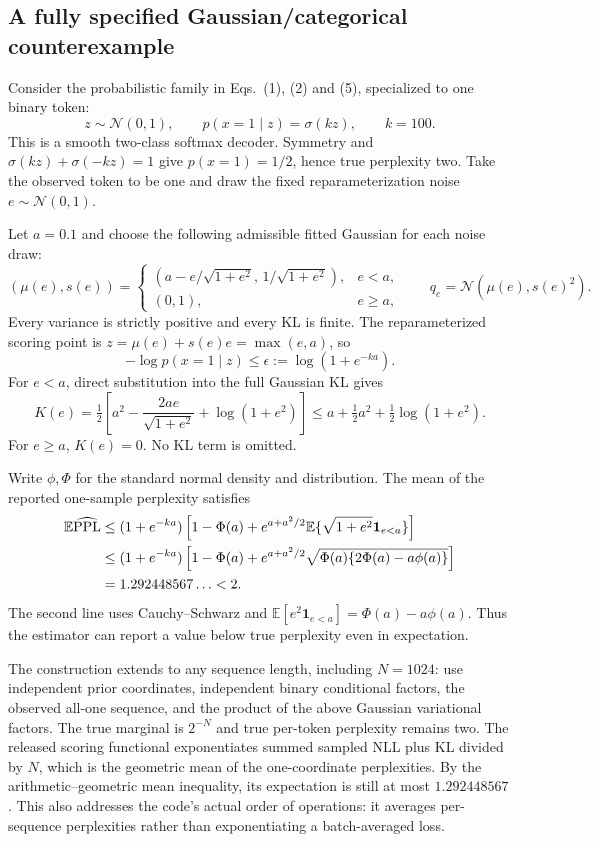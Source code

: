\documentclass[10pt]{article}
\begin{document}
\subsection*{A fully specified Gaussian/categorical counterexample}
Consider the probabilistic family in Eqs. (1), (2) and (5), specialized to one binary token: \[z\sim\mathcal N(0,1),\qquad
 p(x=1\mid z)=\sigma(kz),\qquad k=100.\] This is a smooth two-class softmax decoder. Symmetry and \(\sigma(kz)+\sigma(-kz)=1\) give \(p(x=1)=1/2\), hence true perplexity two. Take the observed token to be one and draw the fixed reparameterization noise \(e\sim\mathcal N(0,1)\).\par
Let \(a=0.1\) and choose the following admissible fitted Gaussian for each noise draw: \[(\mu(e),s(e))=
 \begin{cases}
 (a-e/\sqrt{1+e^2},\,1/\sqrt{1+e^2}),&e<a,\\
 (0,1),&e\ge a,
 \end{cases}
 \qquad q_e=\mathcal N(\mu(e),s(e)^2).\] Every variance is strictly positive and every KL is finite. The reparameterized scoring point is \(z=\mu(e)+s(e)e=\max(e,a)\), so \[-\log p(x=1\mid z)\le
 \epsilon:=\log(1+e^{-ka}).\] For \(e<a\), direct substitution into the full Gaussian KL gives \[K(e)=\tfrac12\left[
 a^2-\frac{2ae}{\sqrt{1+e^2}}+\log(1+e^2)
 \right]
 \le a+\tfrac12a^2+\tfrac12\log(1+e^2).\] For \(e\ge a\), \(K(e)=0\). No KL term is omitted.\par
Write \(\phi,\Phi\) for the standard normal density and distribution. The mean of the reported one-sample perplexity satisfies \[\begin{aligned}
 \mathbb E\widehat{\rm PPL}
 &\le (1+e^{-ka})
 \left[1-\Phi(a)+
 e^{a+a^2/2}\mathbb E\{\sqrt{1+e^2}\mathbf1_{e<a}\}\right]\\
 &\le (1+e^{-ka})
 \left[1-\Phi(a)+e^{a+a^2/2}
 \sqrt{\Phi(a)\{2\Phi(a)-a\phi(a)\}}\right]\\
 &=1.292448567\ldots<2.\end{aligned}\] The second line uses Cauchy–Schwarz and \(\mathbb E[e^2\mathbf1_{e<a}]=\Phi(a)-a\phi(a)\). Thus the estimator can report a value below true perplexity even in expectation.\par
The construction extends to any sequence length, including \(N=1024\): use independent prior coordinates, independent binary conditional factors, the observed all-one sequence, and the product of the above Gaussian variational factors. The true marginal is \(2^{-N}\) and true per-token perplexity remains two. The released scoring functional exponentiates summed sampled NLL plus KL divided by \(N\), which is the geometric mean of the one-coordinate perplexities. By the arithmetic–geometric mean inequality, its expectation is still at most \(1.292448567\). This also addresses the code’s actual order of operations: it averages per-sequence perplexities rather than exponentiating a batch-averaged loss.\par
\end{document}

